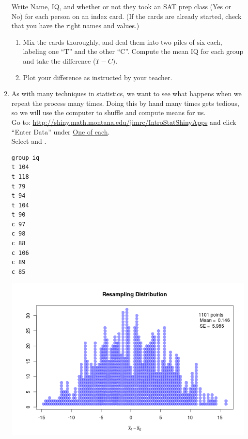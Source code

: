 \begin{enumerate}
Write Name, IQ, and whether or not they took an SAT prep class (Yes or
No) for each person on an index card.
(If the cards are already started, check that you have the right
names and values.)  
   \begin{enumerate}
   \item Mix the cards thoroughly, and deal them into two piles of six
     each, labeling one ``T'' and the other ``C''.
     Compute the mean IQ for each group and take the difference
     ($T - C)$.\vspace{1cm}
   \item Plot your difference as instructed by your teacher. \vspace{1cm} 
\end{enumerate}

\item As with many techniques in statistics, we want to see what
  happens when we repeat the process many times.  Doing this by hand
  many times gets tedious, so we will use the computer to shuffle and
  compute means for us. \\ Go to:
  \url{http://shiny.math.montana.edu/jimrc/IntroStatShinyApps} and click
  ``Enter Data'' under \underline{One of each}. \\
   Select  and .
 \begin{minipage}{.50\linewidth}
{\footnotesize
\begin{verbatim}
group iq
t 104
t 118
t 79
t 94
t 104
t 90
c 97
c 98
c 88
c 106
c 89
c 85
\end{verbatim}
}
 \end{minipage}
\begin{key}
  \begin{minipage}{.50\linewidth}
    \includegraphics[width=\linewidth]{plots/IQ-shuffle.png}
  \end{minipage}
\end{key}


\end{enumerate}
